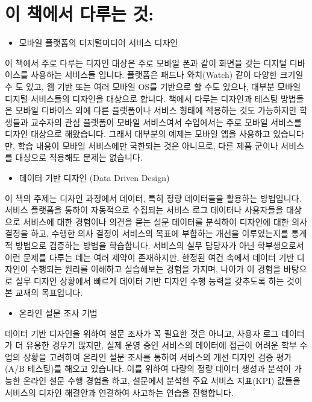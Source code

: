 \documentclass[
  letterpaper,
  DIV=11,
  numbers=noendperiod]{scrreprt}
\providecommand{\tightlist}{%
  \setlength{\itemsep}{0pt}\setlength{\parskip}{0pt}}\usepackage{longtable,booktabs,array}
\begin{document}
\section{이 책에서 다루는
것:}\label{uxc774-uxcc45uxc5d0uxc11c-uxb2e4uxb8e8uxb294-uxac83}

\begin{itemize}
\tightlist
\item
  모바일 플랫폼의 디지털미디어 서비스 디자인
\end{itemize}

이 책에서 주로 다루는 디자인 대상은 주로 모바일 폰과 같이 화면을 갖는
디지털 디바이스를 사용하는 서비스들 입니다. 플랫폼은 패드나 와치(Watch)
같이 다양한 크기일 수 도 있고, 웹 기반 또는 여러 모바일 OS를 기반으로 할
수도 있으나, 대부분 모바일 디지털 서비스들의 디자인을 대상으로 합니다.
책에서 다루는 디자인과 테스팅 방법들은 모바일 디바이스 외에 다른
플랫폼이나 서비스 형태에 적용하는 것도 가능하지만 학생들과 교수자의 관심
플랫폼이 모바일 서비스여서 수업에서는 주로 모바일 서비스를 디자인
대상으로 해왔습니다. 그래서 대부분의 예제는 모바일 앱을 사용하고
있습니다만, 학습 내용이 모바일 서비스에만 국한되는 것은 아니므로, 다른
제품 군이나 서비스를 대상으로 적용해도 문제는 없습니다.

\begin{itemize}
\tightlist
\item
  데이터 기반 디자인 (Data Driven Design)
\end{itemize}

이 책의 주제는 디자인 과정에서 데이터, 특히 정량 데이터들을 활용하는
방법입니다. 서비스 플랫폼을 통하여 자동적으로 수집되는 서비스 로그
데이터나 사용자들을 대상으로 서비스에 대한 경험이나 의견을 묻는 설문
데이터를 분석하여 디자인에 대한 의사 결정을 하고, 수행한 의사 결정이
서비스의 목표에 부합하는 개선을 이루었는지를 통계적 방법으로 검증하는
방법을 학습합니다. 서비스의 실무 담당자가 아닌 학부생으로서 이런 문제를
다루는 데는 여러 제약이 존재하지만, 한정된 여건 속에서 데이터 기반
디자인이 수행되는 원리를 이해하고 실습해보는 경험을 가지며, 나아가 이
경험을 바탕으로 실무 디자인 상황에서 빠르게 데이터 기반 디자인 수행
능력을 갖추도록 하는 것이 본 교재의 목표입니다.

\begin{itemize}
\tightlist
\item
  온라인 설문 조사 기법
\end{itemize}

데이터 기반 디자인을 위하여 설문 조사가 꼭 필요한 것은 아니고, 사용자
로그 데이터가 더 유용한 경우가 많지만, 실제 운영 중인 서비스의 데이터에
접근이 어려운 학부 수업의 상황을 고려하여 온라인 설문 조사를 통하여
서비스의 개선 디자인 검증 평가(A/B 테스팅)를 해오고 있습니다. 이를
위하여 다량의 정량 데이터 생성과 분석이 가능한 온라인 설문 수행 경험을
하고, 설문에서 분석한 주요 서비스 지표(KPI) 값들을 서비스의 디자인
해결안과 연결하여 사고하는 연습을 진행합니다.
\end{document}
